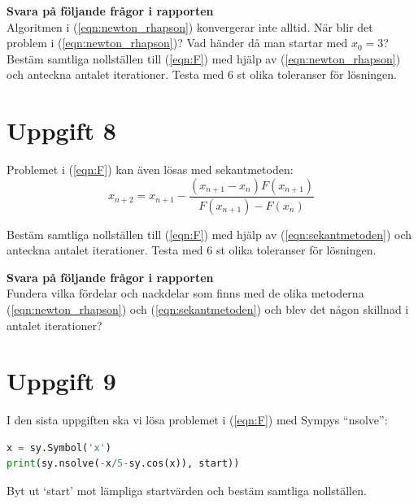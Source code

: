 \documentclass[a4paper]{article}
\begin{document}
\textbf{Svara på följande frågor i rapporten}\\
Algoritmen i (\ref{eqn:newton_rhapson}) konvergerar inte alltid. När blir det problem i (\ref{eqn:newton_rhapson})?
Vad händer då man startar med \( x_0 = 3  \)? Bestäm samtliga nollställen
till (\ref{eqn:F}) med hjälp av (\ref{eqn:newton_rhapson}) och anteckna antalet
iterationer. Testa med 6 st olika toleranser för lösningen.


\section{Uppgift 8}
Problemet i (\ref{eqn:F}) kan även lösas med sekantmetoden:
\begin{equation} \label{eqn:sekantmetoden}
  x_{n+2}=x_{n+1}-\frac{(x_{n+1}-x_n)F(x_{n+1})}{F(x_{n+1})-F(x_n)}
\end{equation}


Bestäm samtliga nollställen till (\ref{eqn:F}) med hjälp av
(\ref{eqn:sekantmetoden}) och anteckna antalet iterationer.
Testa med 6 st olika toleranser för lösningen.



\textbf{Svara på följande frågor i rapporten}\\
Fundera vilka fördelar och nackdelar som finns med de olika metoderna
(\ref{eqn:newton_rhapson}) och (\ref{eqn:sekantmetoden}) och blev det
någon skillnad i antalet iterationer?


\section{Uppgift 9}
I den sista uppgiften ska vi lösa problemet i (\ref{eqn:F}) med Sympys ``nsolve'':

\begin{lstlisting}[language=Python]
x = sy.Symbol('x')
print(sy.nsolve(-x/5-sy.cos(x)), start))
\end{lstlisting}

Byt ut `start' mot lämpliga startvärden och bestäm samtliga nollställen.








\newpage
\printbibliography{}
\end{document}
